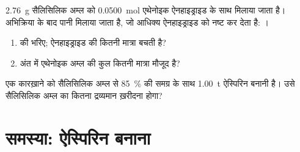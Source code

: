 \begin{exercise}[$\star\star\star$]\label{exo:g10:synthesis-yield:14}
\qty{2.76}{g} सैलिसिलिक अम्ल को \qty{0.0500}{mol}
एथेनोइक ऐनहाइड्राइड के साथ मिलाया जाता है। अभिक्रिया के बाद पानी मिलाया जाता है,
जो आधिक्य ऐनहाइड्राइड को नष्ट कर देता है: ।
\begin{enumerate}
  \item {} की  भरिए; ऐनहाइड्राइड की कितनी
        मात्रा बचती है?
  \item अंत में एथेनोइक अम्ल की कुल कितनी मात्रा मौजूद है?
\end{enumerate}
\end{exercise}

\begin{exercise}[$\star\star\star$]\label{exo:g10:synthesis-yield:15}
एक कारख़ाने को सैलिसिलिक अम्ल से \qty{85}{\percent} की समग्र  के साथ
\qty{1.00}{t} ऐस्पिरिन बनानी है। उसे सैलिसिलिक अम्ल का कितना द्रव्यमान
ख़रीदना होगा?
\end{exercise}

\section{समस्या: ऐस्पिरिन बनाना}

